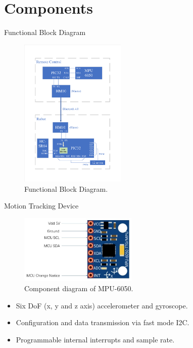 \documentclass[12pt]{beamer}
\begin{document}
\section{Components}
\begin{frame}{Functional Block Diagram}
    \begin{figure}[H]
        \centering
        \includegraphics[width=0.45\textwidth]{Diagram.pdf}
        \caption{Functional Block Diagram.}
    \end{figure}
\end{frame}

\begin{frame}{Motion Tracking Device}
    \begin{figure}[H]
        \centering
        \includegraphics[width=0.5\textwidth]{MPU.jpg}
        \caption{Component diagram of MPU-6050.}
    \end{figure}
    \begin{itemize}
        \item Six DoF (x, y and z axis) accelerometer and gyroscope.
        \item Configuration and data transmission via fast mode I2C.
        \item Programmable internal interrupts and sample rate.
    \end{itemize}
\end{frame}
\end{document}
